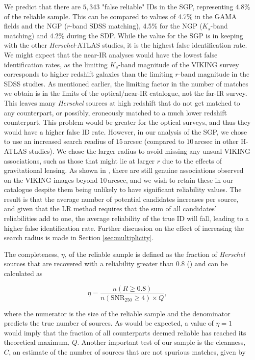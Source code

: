 We predict that there are $5,343$ "false reliable" IDs in the SGP, representing $4.8\%$ of the reliable sample. This can be compared to values of 4.7\% in the GAMA fields and the NGP ($r$-band SDSS matching), 4.5\% for the NGP ($K_s$-band matching) and 4.2\% during the SDP. While the value for the SGP is in keeping with the other \textit{Herschel}-ATLAS studies, it is the highest false identification rate. We might expect that the near-IR analyses would have the lowest false identification rates, as the limiting $K_s$-band magnitude of the VIKING survey corresponds to higher redshift galaxies than the limiting $r$-band magnitude in the SDSS studies. As mentioned earlier, the limiting factor in the number of matches we obtain is in the limits of the optical/near-IR catalogue, not the far-IR survey. This leaves many \textit{Herschel} sources at high redshift that do not get matched to any counterpart, or possibly, eroneously matched to a much lower redshift counterpart. This problem would be greater for the optical surveys, and thus they would have a higher false ID rate. However, in our analysis of the SGP, we chose to use an increased search readius of $15\,$arcsec (compared to $10\,$arcsec in other H-ATLAS studies). We chose the larger radius to avoid missing any unsual VIKING associations, such as those that might lie at larger $r$ due to the effects of gravitational lensing. As shown in \citealt{Bakx_2020}, there are still genuine associations observed on the VIKING images beyond $10\,$arcsec, and we wish to retain these in our catalogue despite them being unlikely to have significant reliability values. The result is that the average number of potential candidates increases per source, and given that the LR method requires that the sum of all candidates' reliabilities add to one, the average reliability of the true ID will fall, leading to a higher false identification rate. Further discussion on the effect of increasing the search radius is made in Section \ref{sec:multiplicity}.

The completeness, $\eta$, of the reliable sample is defined as the fraction of \textit{Herschel} sources that are recovered with a reliability greater than $0.8$ (\citealt{Smith_2011}) and can be calculated as

\begin{equation}
    \eta = \frac{n(R \geq 0.8)}{n(\textrm{SNR}_{250} \geq 4) \times Q},
\label{eq:completeness}
\end{equation}

\noindent where the numerator is the size of the reliable sample and the denominator predicts the true number of sources. As would be expected, a value of $\eta = 1$ would imply that the fraction of all counterparts deemed reliable has reached its theoretical maximum, $Q$. Another important test of our sample is the cleanness, $C$, an estimate of the number of sources that are not spurious matches, given by

